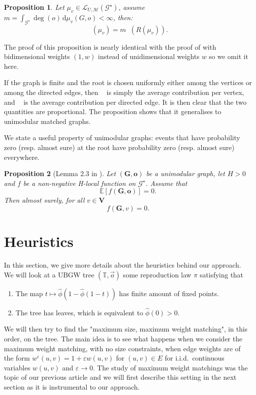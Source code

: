 \documentclass[11pt]{article}
\newtheorem{prop}{Proposition}[section]
\newcommand{\eps}{\varepsilon}
\DeclareMathOperator{\perfE}{perf_E}
\DeclareMathOperator{\perfV}{perf_V}
\begin{document}
\begin{prop}\label{prop:chgmtpdv}
    Let $\mu_{v} \in \mathcal{L}_{U,\mathcal{M}}(\mathcal{G}^{\star})$, assume $m = \int_{\mathcal G^{\star}} \deg (o) \, \mathrm{d} \mu_v(G,o) < \infty$, then:
    \[  \perfV(\mu_{v}) =m\perfE(R(\mu_{v})).  \]
\end{prop}
The proof of this proposition is nearly identical with the proof of \cite[Proposition~2.12]{enriquez2024optimalunimodularmatching} with bidimensional weights $(1,w)$ instead of unidimensional weights $w$ so we omit it here.
\begin{remark}
If the graph is finite and the root is chosen uniformly either among the vertices or among the directed edges, then $\perfV$ is simply the average contribution per vertex, and $\perfE$ is the average contribution per directed edge. 
It is then clear that the two quantities are proportional. The proposition shows that it generalises to unimodular matched graphs. 
\end{remark}
We state a useful property of unimodular graphs: events that have probability zero (resp. almost sure) at the root have probability zero (resp. almost sure) everywhere.
\begin{prop}[Lemma 2.3 in \cite{aldous2018processes}]
    Let $(\mathbf{G},\mathbf{o})$ be a unimodular graph, let $H>0$ and $f$ be a non-negative H-local function on $\mathcal{G}^{\star}$.
    Assume that 
    \[ \mathbb{E}\left[ f(\mathbf{G},\mathbf{o})\right]=0 .\]
    Then almost surely, for all $v \in \mathbf{V}$ 
    \[ f(\mathbf{G},v)=0. \]
\end{prop}

\section{Heuristics}\label{sec:heuristic}
In this section, we give more details about the heuristics behind our approach. We will look at a UBGW tree $(\mathbb{T},\overset{\rightarrow}{o})$ some reproduction law $\pi$ satisfying that
\begin{enumerate}
    \item The map $t \mapsto \hat{\phi}(1-\hat{\phi}(1-t))$ has finite amount of fixed points.
    \item The tree has leaves, which is equivalent to $\hat{\phi}(0)>0$.
\end{enumerate}
We will then try to find the "maximum size, maximum weight matching", in this order, on the tree.
The main idea is to see what happens when we consider the maximum weight matching, with no size constraints, when edge weights are of the form $w^\eps(u,v)=1+\eps w(u,v)$ for $(u,v) \in E$ for i.i.d.~continuous variables $w(u,v)$ and $\varepsilon \to 0$. The study of maximum weight matchings was the topic of our previous article \cite{enriquez2024optimalunimodularmatching} and we will first describe this setting in the next section as it is instrumental to our approach.
\end{document}
